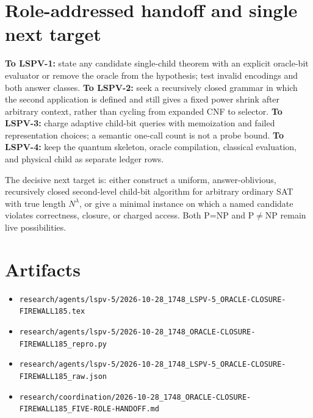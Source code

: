 \documentclass[11pt]{article}
\begin{document}
\section{Role-addressed handoff and single next target}
\textbf{To LSPV-1:} state any candidate single-child theorem with an explicit
oracle-bit evaluator or remove the oracle from the hypothesis; test invalid
encodings and both answer classes.  
\textbf{To LSPV-2:} seek a recursively closed grammar in which the second
application is defined and still gives a fixed power shrink after arbitrary
context, rather than cycling from expanded CNF to selector.  
\textbf{To LSPV-3:} charge adaptive child-bit queries with memoization and
failed representation choices; a semantic one-call count is not a probe
bound.  
\textbf{To LSPV-4:} keep the quantum skeleton, oracle compilation, classical
evaluation, and physical child as separate ledger rows.

The decisive next target is: either construct a uniform, answer-oblivious,
recursively closed second-level child-bit algorithm for arbitrary ordinary SAT
with true length $N^\lambda$, or give a minimal instance on which a named
candidate violates correctness, closure, or charged access.  Both P=NP and
P$\ne$NP remain live possibilities.

\section*{Artifacts}
\begin{itemize}
\item \texttt{research/agents/lspv-5/2026-10-28\_1748\_LSPV-5\_ORACLE-CLOSURE-FIREWALL185.tex}
\item \texttt{research/agents/lspv-5/2026-10-28\_1748\_ORACLE-CLOSURE-FIREWALL185\_repro.py}
\item \texttt{research/agents/lspv-5/2026-10-28\_1748\_LSPV-5\_ORACLE-CLOSURE-FIREWALL185\_raw.json}
\item \texttt{research/coordination/2026-10-28\_1748\_ORACLE-CLOSURE-FIREWALL185\_FIVE-ROLE-HANDOFF.md}
\end{itemize}

\end{document}
